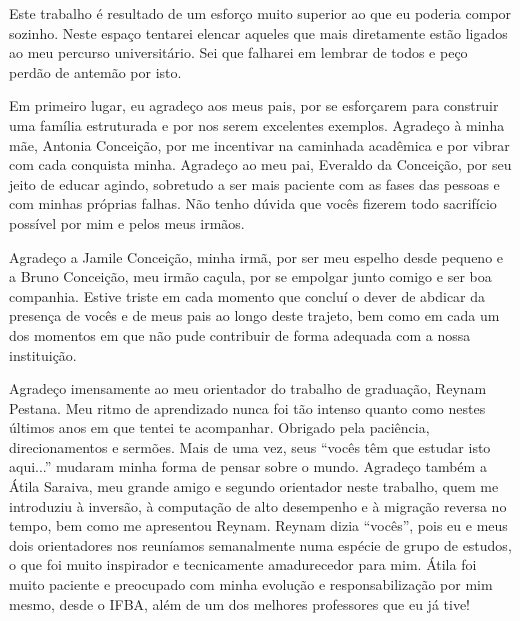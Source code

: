  
 
  Este trabalho é resultado de um esforço muito superior ao que eu poderia compor sozinho. Neste espaço tentarei elencar aqueles que mais diretamente estão ligados ao meu percurso universitário. Sei que falharei em lembrar de todos e peço perdão de antemão por isto.

  Em primeiro lugar, eu agradeço aos meus pais, por se esforçarem para construir uma família estruturada e por nos serem excelentes exemplos. Agradeço à minha mãe, Antonia Conceição, por me incentivar na caminhada acadêmica e por vibrar com cada conquista minha. Agradeço ao meu pai, Everaldo da Conceição, por seu jeito de educar agindo, sobretudo a ser mais paciente com as fases das pessoas e com minhas próprias falhas. Não tenho dúvida que vocês fizerem todo sacrifício possível por mim e pelos meus irmãos.

  Agradeço a Jamile Conceição, minha irmã, por ser meu espelho desde pequeno e a Bruno Conceição, meu irmão caçula, por se empolgar junto comigo e ser boa companhia. Estive triste em cada momento que concluí o dever de abdicar da presença de vocês e de meus pais ao longo deste trajeto, bem como em cada um dos momentos em que não pude contribuir de forma adequada com a nossa instituição.

  Agradeço imensamente ao meu orientador do trabalho de graduação, Reynam Pestana. Meu ritmo de aprendizado nunca foi tão intenso quanto como nestes últimos anos em que tentei te acompanhar. Obrigado pela paciência, direcionamentos e sermões. Mais de uma vez, seus ``vocês têm que estudar isto aqui...'' mudaram minha forma de pensar sobre o mundo. Agradeço também a Átila Saraiva, meu grande amigo e segundo orientador neste trabalho, quem me introduziu à inversão, à computação de alto desempenho e à migração reversa no tempo, bem como me apresentou Reynam. Reynam dizia ``vocês'', pois eu e meus dois orientadores nos reuníamos semanalmente numa espécie de grupo de estudos, o que foi muito inspirador e tecnicamente amadurecedor para mim. Átila foi muito paciente e preocupado com minha evolução e responsabilização por mim mesmo, desde o IFBA, além de um dos melhores professores que eu já tive!

